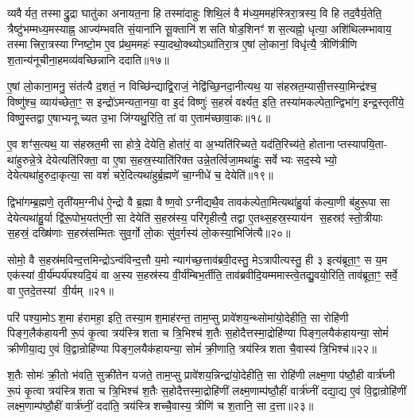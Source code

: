 व्यवैर्यत॒ तस्माद्रु॒द्रा घातु॑का अनायत॒ना हि तस्मा॑दाहुः शिथि॒लं वै म॑ध्य॒ममह॑स्त्रिरा॒त्रस्य॒ वि हि तद॒वैर्य॒तेति॒ त्रैष्टु॑भम्मध्य॒मस्याह्न॒ आज्य॑म्भवति सं॒याना॑नि सू॒क्तानि॑ शसति षोड॒शिनꣳ॑ शस॒त्यह्नो॒ धृत्या॒ अशि॑थिलम्भावाय॒ तस्मात्त्रिरा॒त्रस्याग्निष्टो॒म ए॒व प्र॑थ॒ममहः॑ स्या॒दथो॒क्थ्योऽथा॑तिरा॒त्र ए॒षां लो॒कानां॒ विधृ॑त्यै॒ त्रीणि॑त्रीणि श॒तान्य॑नूचीना॒हमव्य॑वच्छिन्नानि ददाति॥१७॥

ए॒षां लो॒काना॒मनु॒ संत॑त्यै द॒शतं॒ न विच्छि॑न्द्याद्वि॒राजं॒ नेद्वि॑च्छि॒नदा॒नीत्यथ॒ या स॑हस्रत॒म्यासी॒त्तस्या॒मिन्द्र॑श्च॒ विष्णु॑श्च॒ व्याय॑च्छेता॒ꣳ॒ स इन्द्रो॑ऽमन्यता॒नया॒ वा इ॒दं विष्णुः॑ स॒हस्रं॑ वर्क्ष्यत॒ इति॒ तस्या॑मकल्पेता॒न्द्विभा॑ग॒ इन्द्र॒स्तृती॑ये॒ विष्णु॒स्तद्वा ए॒षाभ्यनूच्यत उ॒भा जि॑ग्यथु॒रिति॒ तां वा ए॒ताम॑च्छावा॒कः॥१८॥

ए॒व शꣳ॑स॒त्यथ॒ या स॑हस्रत॒मी सा होत्रे॒ देयेति॒ होता॑रं॒ वा अ॒भ्यति॑रिच्यते॒ यद॑ति॒रिच्य॑ते॒ होतानाप्तस्यापयि॒ता- था॑हुरुन्ने॒त्रे देयेत्यति॑रिक्ता॒ वा ए॒षा स॒हस्र॒स्याति॑रिक्त उन्ने॒तर्त्विजा॒मथा॑हुः॒ सर्वेभ्यः सद॒स्येभ्यो॒ देयेत्यथा॑हुरुदा॒कृत्या॒ सा वशं॑ चरे॒दित्यथा॑हुर्ब्र॒ह्मणे॑ चा॒ग्नीधे॑ च॒ देयेति॑॥१९॥

द्विभा॑गम्ब्र॒ह्मणे॒ तृती॑यम॒ग्नीध॑ ऐ॒न्द्रो वै ब्र॒ह्मा वैष्ण॒वोऽग्नीद्यथै॒व तावक॑ल्पेता॒मित्यथा॑हु॒र्या क॑ल्या॒णी ब॑हुरू॒पा सा देयेत्यथा॑हु॒र्या द्वि॑रू॒पोभ॒यत॑एनी॒ सा देयेति॑ स॒हस्र॑स्य॒ परि॑गृहीत्यै॒ तद्वा ए॒तथ्स॒हस्र॒स्याय॑न स॒हस्रꣵ॑ स्तो॒त्रीयाः स॒हस्रं॒ दख्षि॑णाः स॒हस्र॑सम्मितः सुव॒र्गो लो॒कः सु॑व॒र्गस्य॑ लो॒कस्या॒भिजि॑त्यै॥२०॥

{\anuvakamend[{अ॒ब्र॒वी॒च्च॒ तद॒न्तरि॑ख्षन्ददात्यच्छावा॒कश्च॒ देयेति॑ स॒प्तच॑त्वारिशच्च॥५॥}]}

सोमो॒ वै स॒हस्र॑मविन्द॒त्तमिन्द्रोऽन्व॑विन्द॒त्तौ य॒मो न्याग॑च्छ॒त्ताव॑ब्रवी॒दस्तु॒ मेऽत्रापीत्यस्तु॒ ही ३ इत्य॑ब्रूता॒ꣳ॒ स य॒म एक॑स्यां वी॒र्य॑म्पर्य॑पश्यदि॒यं वा अ॒स्य स॒हस्र॑स्य वी॒र्य॑म्बिभ॒र्तीति॒ ताव॑ब्रवीदि॒यम्ममास्त्वे॒तद्यु॒वयो॒रिति॒ ताव॑ब्रूता॒ꣳ॒ सर्वे॒ वा ए॒तदे॒तस्यां वी॒र्यम्॥२१॥

परि॑ पश्या॒मोऽश॒मा ह॑रामहा॒ इति॒ तस्या॒मश॒माह॑रन्त॒ ताम॒प्सु प्रावे॑शय॒न्थ्सोमा॑यो॒देहीति॒ सा रोहि॑णी पिङ्ग॒लैक॑हायनी रू॒पं कृ॒त्वा त्रय॑स्त्रिशता च त्रि॒भिश्च॑ श॒तैः स॒होदैत्तस्मा॒द्रोहि॑ण्या पिङ्ग॒लयैक॑हायन्या॒ सोमं॑ क्रीणीया॒द्य ए॒वं वि॒द्वान्रोहि॑ण्या पिङ्ग॒लयैक॑हायन्या॒ सोमं॑ क्री॒णाति॒ त्रय॑स्त्रिशता चै॒वास्य॑ त्रि॒भिश्च॑॥२२॥

श॒तैः सोमः॑ क्री॒तो भ॑वति॒ सुक्री॑तेन यजते॒ ताम॒प्सु प्रावे॑शय॒न्निन्द्रा॑यो॒देहीति॒ सा रोहि॑णी लक्ष्म॒णा प॑ष्ठौ॒ही वार्त्र॑घ्नी रू॒पं कृ॒त्वा त्रय॑स्त्रिशता च त्रि॒भिश्च॑ श॒तैः स॒होदैत्तस्मा॒द्रोहि॑णीं लक्ष्म॒णाम्प॑ष्ठौ॒हीं वार्त्र॑घ्नीं दद्या॒द्य ए॒वं वि॒द्वान्रोहि॑णीं लक्ष्म॒णाम्प॑ष्ठौ॒हीं वार्त्र॑घ्नीं॒ ददा॑ति॒ त्रय॑स्त्रिशच्चै॒वास्य॒ त्रीणि॑ च श॒तानि॒ सा द॒त्ता॥२३॥

